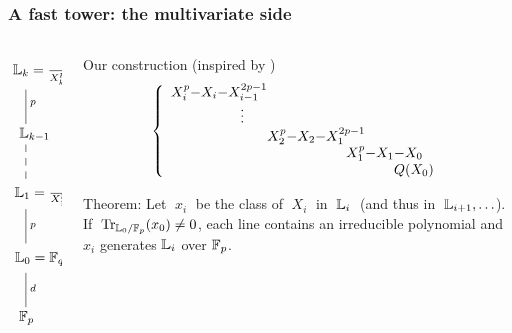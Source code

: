 \documentclass[10pt]{beamer}
\renewcommand{\emph}[1]{{\usebeamercolor[fg]{structure}#1}}
\begin{document}
\begin{frame}
  \frametitle{A fast tower: the multivariate side}

  \vspace{-2mm}

  \begin{columns}
    \begin{column}{0.3\textwidth}
      \Large$\xymatrix{
          *+[r]{\LK_k = \frac{\LK_{k-1}[X_k]}{X_k^p-X_k-x_{k-1}^{2p-1}}}\ar@{-}[d]^p\\
          *+[r]{\LK_{k-1}} \ar@{--}[d]\\
          *+[r]{\LK_1 = \frac{\LK_0[X_1]}{X_1^p-X_1-x_0}} \ar@{-}[d]^p\\
          *+[r]{\LK_0 = \F_q = \frac{\F_p[X_0]}{Q(X_0)}} \ar@{-}[d]^d\\
          *+[r]{\F_p}
        }$
    \end{column}
    \begin{column}{0.65\textwidth}
      \begin{block}{Our construction (inspired by \cite{cantor89})}
        \begin{equation*}
          \left\{
            \begin{array}{r@{}c@{}c@{}c@{}c@{}r@{}c@{}l}
              X^p_i & -X_i & -X_{i-1}^{2p-1}\\
              &&\vdots\\
              &&&X_2^p & -X_2 & -X_1^{2p-1}\\
              &&&&&X_1^p & -X_1 & -X_0\\
              &&&&&&&Q(X_0)
            \end{array}
          \right.
        \end{equation*}


        \emph{Theorem:} Let $\;x_i\;$ be the class of $\;X_i\;$ in
        $\;\mathbb{L}_i\;$ (and thus in $\;\mathbb{L}_{i+1},\ldots$).  If
        $\;\operatorname{Tr}_{\mathbb{L}_0/\mathbb{F}_p}(x_0) \ne 0$, each line contains an
        irreducible polynomial and \alert{$x_i$ generates $\mathbb{L}_i$ over
          $\mathbb{F}_p$.}
      \end{block}
    \end{column}
  \end{columns}
\end{frame}

\end{document}

